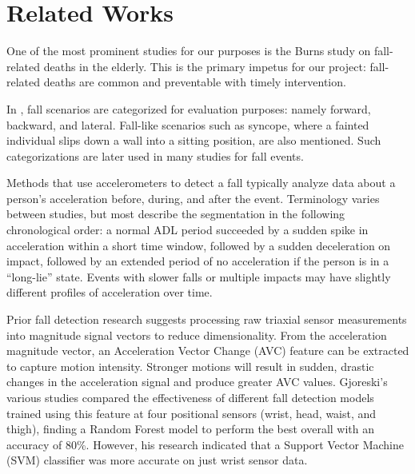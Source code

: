 \documentclass{llncs}
\begin{document}
\section{Related Works}
  One of the most prominent studies for our purposes is the Burns study on fall-related deaths in the elderly.\cite{burns2018deaths} This is the primary impetus for our project: fall-related deaths are common and preventable with timely intervention.
    
    In \cite{noury2007principles}, fall scenarios are categorized for evaluation purposes: namely forward, backward, and lateral. Fall-like scenarios such as syncope, where a fainted individual slips down a wall into a sitting position, are also mentioned. Such categorizations are later used in many studies for fall events.
     
    Methods that use accelerometers to detect a fall typically analyze data about a person's acceleration before, during, and after the event. Terminology varies between studies, but most describe the segmentation in the following chronological order: a normal ADL period succeeded by a sudden spike in acceleration within a short time window, followed by a sudden deceleration on impact, followed by an extended period of no acceleration if the person is in a ``long-lie'' state. Events with slower falls or multiple impacts may have slightly different profiles of acceleration over time.\cite{kangas2009sensitivity}
    
    Prior fall detection research suggests processing raw triaxial sensor measurements into magnitude signal vectors to reduce dimensionality. From the acceleration magnitude vector, an Acceleration Vector Change (AVC) feature can be extracted to capture motion intensity. Stronger motions will result in sudden, drastic changes in the acceleration signal and produce greater AVC values.\cite{gjoreski2016accurately} Gjoreski's various studies compared the effectiveness of different fall detection models trained using this feature at four positional sensors (wrist, head, waist, and thigh), finding a Random Forest model to perform the best overall with an accuracy of 80\%. However, his research indicated that a Support Vector Machine (SVM) classifier was more accurate on just wrist sensor data. 
 
\end{document}

